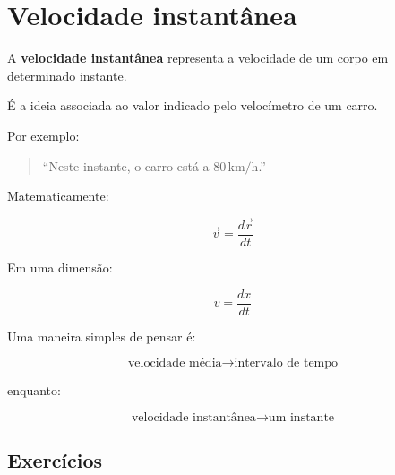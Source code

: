 \documentclass[a4paper,12pt]{article}
\begin{document}
\section{Velocidade instantânea}

\begin{ideia}

A \textbf{velocidade instantânea} representa a velocidade de um
corpo em determinado instante.

É a ideia associada ao valor indicado pelo velocímetro de um carro.

Por exemplo:

\begin{quote}
``Neste instante, o carro está a $80\,\text{km/h}$.''
\end{quote}

Matematicamente:

\[
\boxed{
\vec v=
\frac{d\vec r}{dt}
}
\]

Em uma dimensão:

\[
\boxed{
v=
\frac{dx}{dt}
}
\]

\end{ideia}


\begin{atencao}

Uma maneira simples de pensar é:

\[
\boxed{
\text{velocidade média}
\rightarrow
\text{intervalo de tempo}
}
\]

enquanto:

\[
\boxed{
\text{velocidade instantânea}
\rightarrow
\text{um instante}
}
\]

\end{atencao}


\subsection*{Exercícios}
\end{document}
